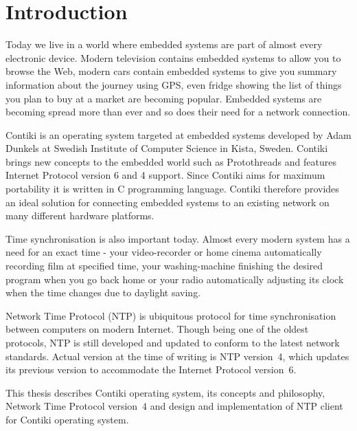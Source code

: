
\chapter{Introduction}
Today we live in a world where embedded systems are part of almost every electronic device.
Modern television contains embedded systems to allow you to browse the Web,
modern cars contain embedded systems to give you summary information
about the journey using GPS, even fridge showing the list of things you plan to buy at a market are becoming popular.
Embedded systems are becoming spread more than ever and so does
their need for a network connection.

Contiki is an operating system targeted at embedded systems
developed by Adam Dunkels at Swedish Institute of Computer Science in Kista, Sweden.
Contiki brings new concepts to the embedded world such as Protothreads and features
Internet Protocol version 6 and 4 support.
Since Contiki aims for maximum portability it is written in C programming language.
Contiki therefore provides an ideal solution for connecting
embedded systems to an existing network on many different hardware platforms.

Time synchronisation is also important today.
Almost every modern system has a need for an exact time -
your video-recorder or home cinema automatically recording film at specified time, your washing-machine finishing the
desired program when you go back home or your radio automatically adjusting its clock when the time changes
due to daylight saving.

Network Time Protocol (NTP) is ubiquitous protocol for time synchronisation between computers on modern Internet.
Though being one of the oldest protocols, NTP is still developed and updated to conform to the latest
network standards. Actual version at the time of writing is NTP version~4, which updates its previous version to
accommodate the Internet Protocol version~6.

This thesis describes Contiki operating system, its concepts and philosophy,
Network Time Protocol version~4 and design and implementation of NTP client for Contiki operating system.










